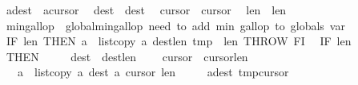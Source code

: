 \begin{isabellebody}
\ \ {\isasymacute}a{\isacharbang}{\isasymacute}dest\ {\isacharcolon}{\isacharequal}{\isacharequal}\ {\isasymacute}a{\isacharbang}{\isasymacute}cursor{}{\isacharsemicolon}{\isacharsemicolon}\isanewline
\ \ {\isasymacute}dest\ {\isacharcolon}{\isacharequal}{\isacharequal}\ {\isasymacute}dest{\isacharminus}{}{\isacharsemicolon}{\isacharsemicolon}\isanewline
\ \ {\isasymacute}cursor{}\ {\isacharcolon}{\isacharequal}{\isacharequal}\ {\isasymacute}cursor{}{\isacharminus}{}{\isacharsemicolon}{\isacharsemicolon}\isanewline
\ \ {\isasymacute}len{}\ {\isacharcolon}{\isacharequal}{\isacharequal}\ {\isasymacute}len{}{\isacharminus}{}{\isacharsemicolon}{\isacharsemicolon}\isanewline
\ \ {\isasymacute}min{\isacharunderscore}gallop\ {\isacharcolon}{\isacharequal}{\isacharequal}\ {\isasymacute}global{\isacharunderscore}min{\isacharunderscore}gallop{\isacharsemicolon}{\isacharsemicolon}{\isacharparenleft}{\isacharasterisk}\ need\ to\ add\ min\ gallop\ to\ globals\ var\ {\isacharasterisk}{\isacharparenright}\isanewline
\ \ IF\ {\isasymacute}len{}{\isacharequal}{}\ THEN\ {\isasymacute}a\ {\isacharcolon}{\isacharequal}{\isacharequal}\ list{\isacharunderscore}copy\ {\isasymacute}a\ {\isacharparenleft}{\isasymacute}dest{\isacharminus}{\isacharparenleft}{\isasymacute}len{}{\isacharminus}{}{\isacharparenright}{\isacharparenright}\ {\isasymacute}tmp\ {}\ {\isasymacute}len{}{\isacharsemicolon}{\isacharsemicolon}\ THROW\ FI{\isacharsemicolon}{\isacharsemicolon}\isanewline
\ \ IF\ {\isasymacute}len{}{\isacharequal}{}\ \isanewline
\ \ THEN\ \isanewline
\ \ \ \ {\isasymacute}dest\ {\isacharcolon}{\isacharequal}{\isacharequal}\ {\isasymacute}dest{\isacharminus}{\isasymacute}len{}{\isacharsemicolon}{\isacharsemicolon}\isanewline
\ \ \ \ {\isasymacute}cursor{}\ {\isacharcolon}{\isacharequal}{\isacharequal}\ {\isasymacute}cursor{}{\isacharminus}{\isasymacute}len{}{\isacharsemicolon}{\isacharsemicolon}\isanewline
\ \ \ \ {\isasymacute}a\ {\isacharcolon}{\isacharequal}{\isacharequal}\ list{\isacharunderscore}copy\ {\isasymacute}a\ {\isacharparenleft}{\isasymacute}dest{\isacharplus}{}{\isacharparenright}\ {\isasymacute}a\ {\isacharparenleft}{\isasymacute}cursor{}{\isacharplus}{}{\isacharparenright}\ {\isasymacute}len{}{\isacharsemicolon}{\isacharsemicolon}\ \isanewline
\ \ \ \ {\isasymacute}a{\isacharbang}{\isasymacute}dest{\isacharcolon}{\isacharequal}{\isacharequal}\ {\isasymacute}tmp{\isacharbang}{\isasymacute}cursor{}{\isacharsemicolon}{\isacharsemicolon}\isanewline

\end{isabellebody}
